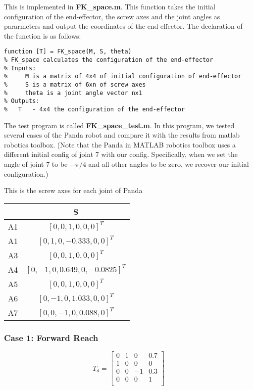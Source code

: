 \documentclass[english,10pt,a4paper]{book}
\begin{document}
	This is implemented in \textbf{FK\_space.m}. This function takes the initial configuration of the end-effector, the screw axes and the joint angles as pararmeters and output the coordinates of the end-effector. The declaration of the function is as follows:
    \begin{lstlisting}[style=matlab]
function [T] = FK_space(M, S, theta)
% FK_space calculates the configuration of the end-effector
% Inputs:
%     M is a matrix of 4x4 of initial configuration of end-effector
%     S is a matrix of 6xn of screw axes
%     theta is a joint angle vector nx1
% Outputs:
%   T   - 4x4 the configuration of the end-effector
    \end{lstlisting}
	
    The test program is called \textbf{FK\_space\_test.m}. In this program, we tested several cases of the Panda robot and compare it with the results from matlab robotics toolbox. (Note that the Panda in MATLAB robotics toolbox uses a different initial config of joint 7 with our config. Specifically, when we set the angle of joint 7 to be $-\pi/4$ and all other angles to be zero, we recover our initial configuration.)
	
    This is the screw axes for each joint of Panda
    \begin{center}
        \begin{tabular}{|c|c|}
            \hline
            &  S \\
            \hline
            A1 & $[0, 0, 1, 0, 0, 0]^{T}$ \\
            \hline
            A1 & $[0, 1, 0, -0.333, 0, 0]^{T}$ \\
            \hline
            A3 & $[0, 0, 1, 0, 0, 0]^{T}$ \\
            \hline
            A4 & $[0, -1, 0, 0.649, 0, -0.0825]^{T}$ \\
            \hline
            A5 & $[0, 0, 1, 0, 0, 0]^{T}$  \\
            \hline
            A6 & $[0, -1, 0, 1.033, 0, 0]^{T}$  \\
            \hline
            A7 & $[0, 0, -1, 0, 0.088, 0]^{T}$ \\
            \hline
        \end{tabular}
    \end{center}
    \subsubsection*{Case 1: Forward Reach}
    $$T_d = \begin{bmatrix}
    	0 & 1 & 0 & 0.7\\
    	1 & 0 & 0 & 0\\
    	0 & 0 & -1 & 0.3 \\
    	0 & 0 & 0 & 1 \\
    \end{bmatrix}$$
    
\end{document}

